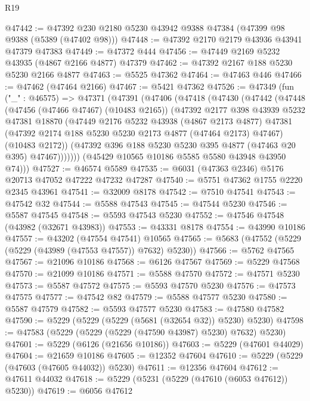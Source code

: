 \begin{lexlean}{R19}
\begin{coremodule}
@47442 := @47392 @230 @2180 @5230 @43942 @9388 @47384 (@47399 @98 @9388 (@5389 (@47402 @98)))
@47448 := @47392 @2170 @2179 @43936 @43941 @47379 @47383
@47449 := @47372 @444
@47456 := @47449 @2169 @5232 @43935 (@4867 @2166 @4877) @47379
@47462 := @47392 @2167 @188 @5230 @5230 @2166 @4877
@47463 := @5525 @47362
@47464 := @47463 @446
@47466 := @47462 (@47464 @2166)
@47467 := @5421 @47362
@47526 := @47349
    (fun ("_" : @46575) =>
    @47371
      (@47391
        (@47406
          (@47418
            (@47430
              (@47442
                (@47448
                  (@47456 (@47466 @47467) (@10483 @2165))
                  (@47392
                    @2177
                    @398
                    @43939
                    @5232
                    @47381
                    @18870
                    (@47449
                      @2176
                      @5232
                      @43938
                      (@4867 @2173 @4877)
                      @47381
                      (@47392 @2174 @188 @5230 @5230 @2173 @4877 (@47464 @2173) @47467)
                      (@10483 @2172))
                    (@47392 @396 @188 @5230 @5230 @395 @4877 (@47463 @20 @395) @47467)))))))
        (@45429 @10565 @10186 @5585 @5580 @43948 @43950 @74)))
@47527 := @46574 @5589
@47535 := @6031 (@47363 @2346) @5176 @20713 @47052 @47222 @47232 @47287
@47540 := @5751 @47362 @1755 @2220 @2345 @43961
@47541 := @32009 @8178
@47542 := @7510 @47541
@47543 := @47542 @32
@47544 := @5588 @47543
@47545 := @47544 @5230
@47546 := @5587 @47545
@47548 := @5593 @47543 @5230
@47552 := @47546 @47548 (@43982 (@32671 @43983))
@47553 := @43331 @8178
@47554 := @43990 @10186
@47557 := @43202 (@47554 @47541) @10565
@47565 := @5683 (@47552 (@5229 (@5229 (@43989 (@47553 @47557)) @7632) @5230))
@47566 := @5762 @47565
@47567 := @21096 @10186
@47568 := @6126 @47567
@47569 := @5229 @47568
@47570 := @21099 @10186
@47571 := @5588 @47570
@47572 := @47571 @5230
@47573 := @5587 @47572
@47575 := @5593 @47570 @5230
@47576 := @47573 @47575
@47577 := @47542 @82
@47579 := @5588 @47577 @5230
@47580 := @5587 @47579
@47582 := @5593 @47577 @5230
@47583 := @47580 @47582
@47590 := @5229 (@5229 (@5229 (@5681 (@32654 @32)) @5230) @5230)
@47598 := @47583 (@5229 (@5229 (@5229 (@47590 @43987) @5230) @7632) @5230)
@47601 := @5229 (@6126 (@21656 @10186))
@47603 := @5229 (@47601 @44029)
@47604 := @21659 @10186
@47605 := @12352 @47604
@47610 := @5229 (@5229 (@47603 (@47605 @44032)) @5230)
@47611 := @12356 @47604
@47612 := @47611 @44032
@47618 := @5229 (@5231 (@5229 (@47610 (@6053 @47612)) @5230))
@47619 := @6056 @47612

\end{coremodule}
\end{lexlean}
